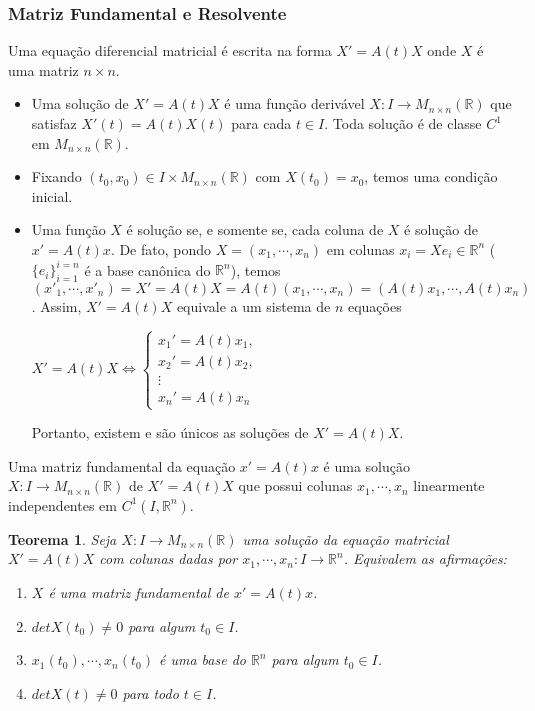 \documentclass[a4paper, 12pt]{article}
\renewcommand{\Bbb}{\mathbb}
\newtheorem*{6}{Teorema}
\begin{document}
\subsubsection{Matriz Fundamental e Resolvente}
Uma equação diferencial matricial é escrita na forma $X'=A(t)X$ onde $X$ é uma matriz $n\times n$.
\begin{itemize}
    \item Uma solução de $X'=A(t)X$ é uma função derivável $X:I\to M_{n\times n}(\Bbb R)$ que satisfaz $X'(t)=A(t)X(t)$ para cada $t \in I$. Toda solução é de classe $C^1$ em $M_{n\times n}(\Bbb R)$.

    \item Fixando $(t_0,x_0) \in I\times M_{n\times n}(\Bbb R)$ com $X(t_0) = x_0$, temos uma condição inicial.

    \item Uma função $X$ é solução se, e somente se, cada coluna de $X$ é solução de $x' = A(t)x$. De fato, pondo $X=(x_1,\cdots,x_n)$ em colunas $x_i=Xe_i\in \Bbb R^n$ ($\{e_i\}^{i=n}_{i=1}$ é a base canônica do $\Bbb R^n$), temos $(x'_1,\cdots,x'_n) = X' = A(t)X = A(t)(x_1,\cdots,x_n)= (A(t)x_1,\cdots,A(t)x_n)$. Assim, $X'=A(t)X$ equivale a um sistema de $n$ equações 
    \begin{center}
        $
        X'=A(t)X \iff
        \begin{cases}
        x_1'=A(t)x_1, \\
        x_2'=A(t)x_2, \\
        \vdots \\
        x_n'=A(t)x_n
        \end{cases}
        $
    \end{center}
    Portanto, existem e são únicos as soluções de $X'=A(t)X$.
\end{itemize}
Uma matriz fundamental da equação $x' = A(t)x$ é uma solução $X:I\to M_{n\times n}(\Bbb R)$ de $X'= A(t)X$ que possui colunas $x_1,\cdots,x_n$ linearmente independentes em $C^1(I,\Bbb R^n)$.
\begin{6}
Seja $X:I\to M_{n\times n}(\Bbb R)$ uma solução da equação matricial $X'=A(t)X$ com colunas dadas por $x_1,\cdots,x_n:I\to \Bbb R^n$. Equivalem as afirmações:
\begin{enumerate}
    \item $X$ é uma matriz fundamental de $x' = A(t)x$.
    \item $detX(t_0) \neq 0$ para algum $t_0 \in I$.
    \item $x_1(t_0),\cdots,x_n(t_0)$ é uma base do $\Bbb R^n$ para algum $t_0 \in I$.
    \item $detX(t) \neq 0$ para todo $t \in I$.
\end{enumerate}
\end{6}
\end{document}
